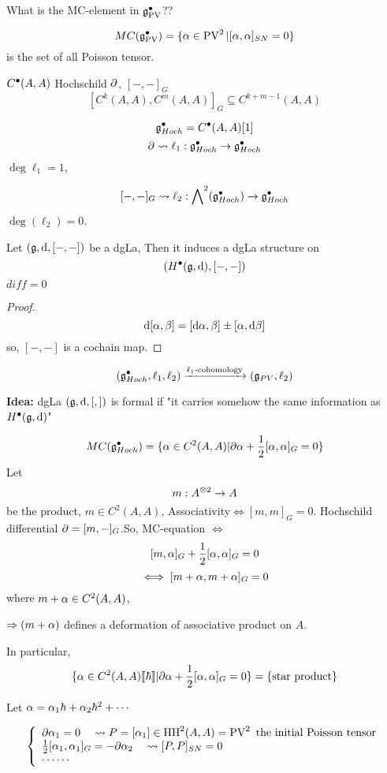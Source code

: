 What is the MC-element in $\mathfrak{g}_{\operatorname{PV}}^{\bullet}$??

$$MC(\mathfrak{g}_{\operatorname{PV}}^{\bullet})=\{\alpha\in\operatorname{PV}^2|[\alpha,\alpha]_{SN}=0\}$$
is the set of all Poisson tensor.

$C^{\bullet}(A,A)$ Hochschild $\partial$, $[-,-]_G$
$$[C^k(A,A),C^m(A,A)]_G\subseteq C^{k+m-1}(A,A)$$

\begin{definition}
$$\mathfrak{g}_{Hoch}^{\bullet}=C^{\bullet}(A,A)[1]$$
$$\partial\rightsquigarrow\ell_1:\mathfrak{g}_{Hoch}^{\bullet}\to\mathfrak{g}_{Hoch}^{\bullet}$$
$\deg\ell_1=1$,

$$[-,-]_G\rightsquigarrow\ell_2:\bigwedge\nolimits^{2}(\mathfrak{g}_{Hoch}^{\bullet})\to\mathfrak{g}_{Hoch}^{\bullet}$$
$\deg(\ell_2)=0$.
\end{definition}

\begin{prop}
Let $(\mathfrak{g},\mathrm{d},[-,-])$ be a dgLa, 
Then it induces a dgLa structure on 
$$(H^{\bullet}(\mathfrak{g},\mathrm{d}),[-,-])$$
$diff=0$
\end{prop}
\begin{proof}
$$\mathrm{d}[\alpha,\beta]=[\mathrm{d}\alpha,\beta]\pm[\alpha,\mathrm{d}\beta]$$
so, $[-,-]$ is a cochain map.
\end{proof}

$$(\mathfrak{g}_{Hoch}^{\bullet},\ell_1,\ell_2)\xrightarrow{\ell_1\text{-cohomology}}
(\mathfrak{g}_{PV},\ell_2)$$

\textbf{Idea:} dgLa $(\mathfrak{g},\mathrm{d},[,])$ is formal if 
"it carries somehow the same information as $H^{\bullet}(\mathfrak{g},\mathrm{d})$"

$$MC(\mathfrak{g}_{Hoch}^{\bullet})=
\{\alpha\in C^2(A,A)|\partial\alpha+\frac{1}{2}[\alpha,\alpha]_G=0\}$$
Let
$$m: A^{\otimes 2}\to A$$
be the product, $m\in C^2(A,A)$, 
Associativity$\iff[m,m]_G=0$. 
Hochschild differential $\partial=[m,-]_G$.So, 
MC-equation $\iff$
$$[m,\alpha]_G+\frac{1}{2}[\alpha,\alpha]_G=0$$
$$\iff [m+\alpha,m+\alpha]_G=0$$
where $m+\alpha\in C^2(A,A)$, %

$\Rightarrow (m+\alpha)$ defines a deformation of associative product on $A$.

In particular,
$$\{\alpha\in C^2(A,A)[\![\hbar]\!]|\partial\alpha+\frac{1}{2}[\alpha,\alpha]_G=0\}=\{\text{star product}\}$$

Let $\alpha=\alpha_1\hbar+\alpha_2\hbar^2+\cdots$

$$
  \left\{
    \begin{array}{l}
      \partial\alpha_1=0\quad \rightsquigarrow P=[\alpha_1]\in\operatorname{HH}^2(A,A)=\operatorname{PV}^2\text{ the initial Poisson tensor}\\
      \frac{1}{2}[\alpha_1,\alpha_1]_G=-\partial\alpha_2 \quad\rightsquigarrow[P,P]_{SN}=0\\
      \cdots\cdots
    \end{array}
  \right.
$$

